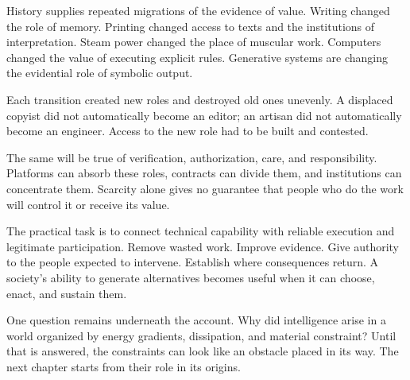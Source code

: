 History supplies repeated migrations of the evidence of value. Writing changed the role of memory. Printing changed access to texts and the institutions of interpretation. Steam power changed the place of muscular work. Computers changed the value of executing explicit rules. Generative systems are changing the evidential role of symbolic output.

Each transition created new roles and destroyed old ones unevenly. A displaced copyist did not automatically become an editor; an artisan did not automatically become an engineer. Access to the new role had to be built and contested.

The same will be true of verification, authorization, care, and responsibility. Platforms can absorb these roles, contracts can divide them, and institutions can concentrate them. Scarcity alone gives no guarantee that people who do the work will control it or receive its value.

The practical task is to connect technical capability with reliable execution and legitimate participation. Remove wasted work. Improve evidence. Give authority to the people expected to intervene. Establish where consequences return. A society's ability to generate alternatives becomes useful when it can choose, enact, and sustain them.

One question remains underneath the account. Why did intelligence arise in a world organized by energy gradients, dissipation, and material constraint? Until that is answered, the constraints can look like an obstacle placed in its way. The next chapter starts from their role in its origins.

